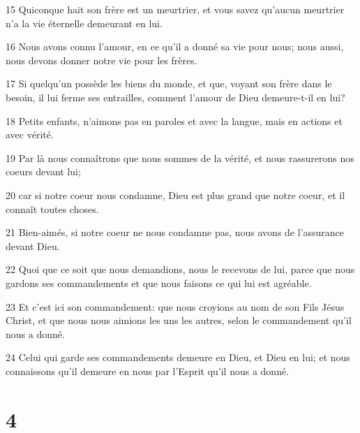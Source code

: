 \par 15 Quiconque hait son frère est un meurtrier, et vous savez qu'aucun meurtrier n'a la vie éternelle demeurant en lui.
\par 16 Nous avons connu l'amour, en ce qu'il a donné sa vie pour nous; nous aussi, nous devons donner notre vie pour les frères.
\par 17 Si quelqu'un possède les biens du monde, et que, voyant son frère dans le besoin, il lui ferme ses entrailles, comment l'amour de Dieu demeure-t-il en lui?
\par 18 Petits enfants, n'aimons pas en paroles et avec la langue, mais en actions et avec vérité.
\par 19 Par là nous connaîtrons que nous sommes de la vérité, et nous rassurerons nos coeurs devant lui;
\par 20 car si notre coeur nous condamne, Dieu est plus grand que notre coeur, et il connaît toutes choses.
\par 21 Bien-aimés, si notre coeur ne nous condamne pas, nous avons de l'assurance devant Dieu.
\par 22 Quoi que ce soit que nous demandions, nous le recevons de lui, parce que nous gardons ses commandements et que nous faisons ce qui lui est agréable.
\par 23 Et c'est ici son commandement: que nous croyions au nom de son Fils Jésus Christ, et que nous nous aimions les uns les autres, selon le commandement qu'il nous a donné.
\par 24 Celui qui garde ses commandements demeure en Dieu, et Dieu en lui; et nous connaissons qu'il demeure en nous par l'Esprit qu'il nous a donné.

\chapter{4}

